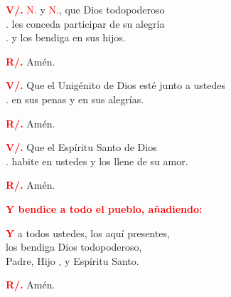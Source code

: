 \documentclass[12pt, letterpaper, spanish]{report}
\begin{document}
\Large \hspace{-0.9cm} {\bfseries \textcolor{red}{V/.}} \hspace{0.5cm} \textcolor{red}{N.} y \textcolor{red}{N.}, que Dios todopoderoso\\
.\hspace{1.5cm} les conceda participar de su alegr\'ia\\
.\hspace{1.5cm} y los bendiga en sus hijos.\newline

\Large \hspace{-0.9cm} {\bfseries \textcolor{red}{R/.}} \hspace{0.5cm} Am\'en.\newline

\Large \hspace{-0.9cm} {\bfseries \textcolor{red}{V/.}} \hspace{0.5cm} Que el Unig\'enito de Dios est\'e junto a ustedes\\
.\hspace{1.5cm} en sus penas y en sus alegr\'ias.\newline

\Large \hspace{-0.9cm} {\bfseries \textcolor{red}{R/.}} \hspace{0.5cm} Am\'en.\newline

\Large \hspace{-0.9cm} {\bfseries \textcolor{red}{V/.}} \hspace{0.5cm} Que el Esp\'iritu Santo de Dios\\
.\hspace{1.5cm} habite en ustedes y los llene de su amor.\newline

\Large \hspace{-0.9cm} {\bfseries \textcolor{red}{R/.}} \hspace{0.5cm} Am\'en.\newline

\large{\bfseries \textcolor{red}{Y bendice a todo el pueblo, a\~nadiendo:}}\newline

\Large \lettrine{\bfseries \textcolor{red}{Y}}{} a todos ustedes, los aqu\'i presentes,\\
los bendiga Dios todopoderoso,\\
Padre, Hijo \Huge{\textcolor{red}{}} \Large, y Esp\'iritu Santo.\newline

\Large \hspace{-0.9cm} {\bfseries \textcolor{red}{R/.}} \hspace{0.5cm} Am\'en.\newline

\end{document}
